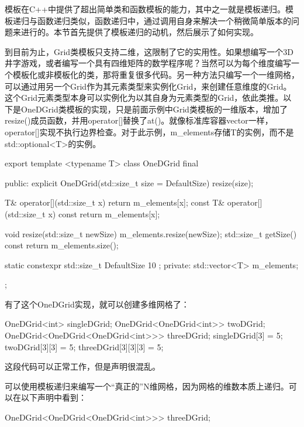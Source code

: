 
模板在C++中提供了超出简单类和函数模板的能力，其中之一就是模板递归。模板递归与函数递归类似，函数递归中，通过调用自身来解决一个稍微简单版本的问题来进行的。本节首先提供了模板递归的动机，然后展示了如何实现。


到目前为止，Grid类模板只支持二维，这限制了它的实用性。如果想编写一个3D井字游戏，或者编写一个具有四维矩阵的数学程序呢？当然可以为每个维度编写一个模板化或非模板化的类，那将重复很多代码。另一种方法只编写一个一维网格，可以通过用另一个Grid作为其元素类型来实例化Grid，来创建任意维度的Grid。这个Grid元素类型本身可以实例化为以其自身为元素类型的Grid，依此类推。以下是OneDGrid类模板的实现，只是前面示例中Grid类模板的一维版本，增加了resize()成员函数，并用operator[]替换了at()。就像标准库容器vector一样，operator[]实现不执行边界检查。对于此示例，m\_elements存储T的实例，而不是std::optional<T>的实例。

\begin{cpp}
export template <typename T>
class OneDGrid final
{
    public:
        explicit OneDGrid(std::size_t size = DefaultSize) { resize(size); }

        T& operator[](std::size_t x) { return m_elements[x]; }
        const T& operator[](std::size_t x) const { return m_elements[x]; }

        void resize(std::size_t newSize) { m_elements.resize(newSize); }
        std::size_t getSize() const { return m_elements.size(); }

        static constexpr std::size_t DefaultSize { 10 };
    private:
        std::vector<T> m_elements;
};
\end{cpp}

有了这个OneDGrid实现，就可以创建多维网格了：

\begin{cpp}
OneDGrid<int> singleDGrid;
OneDGrid<OneDGrid<int>> twoDGrid;
OneDGrid<OneDGrid<OneDGrid<int>>> threeDGrid;
singleDGrid[3] = 5;
twoDGrid[3][3] = 5;
threeDGrid[3][3][3] = 5;
\end{cpp}

这段代码可以正常工作，但是声明很混乱。


可以使用模板递归来编写一个“真正的”N维网格，因为网格的维数本质上递归。可以在以下声明中看到：

\begin{cpp}
OneDGrid<OneDGrid<OneDGrid<int>>> threeDGrid;
\end{cpp}

